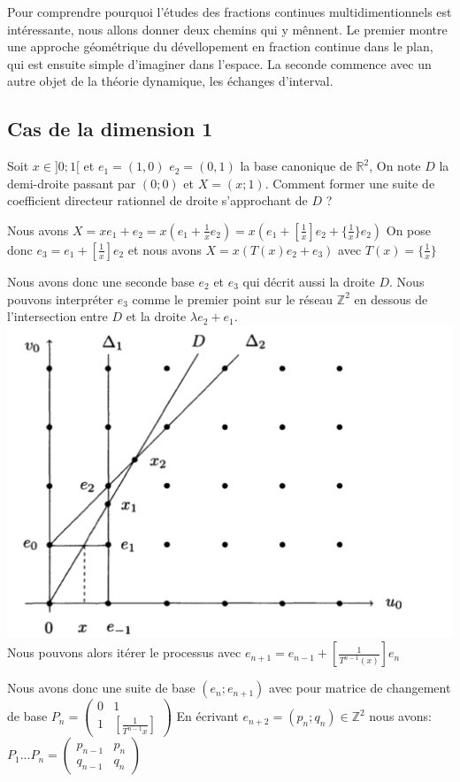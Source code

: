 Pour comprendre pourquoi l'études des fractions continues multidimentionnels est intéressante, nous allons donner deux chemins qui y mênnent.
Le premier montre une approche géométrique du dévellopement en fraction continue dans le plan, qui est ensuite simple d'imaginer dans l'espace.
La seconde commence avec un autre objet de la théorie dynamique, les échanges d'interval.

\subsection{Cas de la dimension 1}

Soit $x \in ]0;1[$ et $e_1=(1,0)$ $e_2=(0,1)$ la base canonique de $\mathbb{R}^2$,
On note $D$ la demi-droite passant par $(0;0)$ et $X=(x;1)$. Comment former une suite de coefficient directeur rationnel de droite s'approchant de $D$ ?

Nous avons $X=xe_1+e_2=x(e_1+\frac{1}{x}e_2)=x(e_1+[\frac{1}{x}]e_2+\{\frac{1}{x}\}e_2)$
On pose donc $e_3=e_1+[\frac{1}{x}]e_2$ et nous avons $X=x(T(x) e_2+e_3)$ avec $T(x)=\{\frac{1}{x}\}$

Nous avons donc une seconde base $e_2$ et $e_3$ qui décrit aussi la droite $D$. Nous pouvons interpréter $e_3$ comme le premier point sur le réseau $\mathbb{Z}^2$ en dessous de l'intersection entre $D$ et la droite $\lambda e_2 +e_1$.
\includegraphics[width=16cm]{Image/ReseauDroite.png}
Nous pouvons alors itérer le processus avec $e_{n+1}=e_{n-1}+[\frac{1}{T^{n-1}(x)}]e_n$

Nous avons donc une suite de base $(e_n;e_{n+1})$ avec pour matrice de changement de base $P_n=
\begin{pmatrix}
   0 & 1 \\
   1 & [\frac{1}{T^{n-1}x}]
\end{pmatrix}$
En écrivant $e_{n+2}=(p_n;q_n)\in \mathbb{Z}^2$ nous avons:
$P_1...P_n=
\begin{pmatrix}
  p_{n-1} & p_n \\
  q_{n-1} & q_n
\end{pmatrix}$

